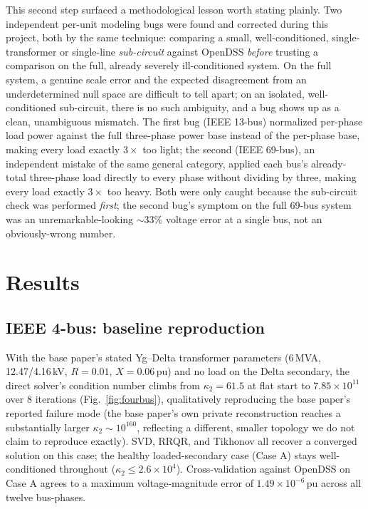 \documentclass[conference]{IEEEtran}
\begin{document}
This second step surfaced a methodological lesson worth stating plainly.
Two independent per-unit modeling bugs were found and corrected during
this project, both by the same technique: comparing a small, well-conditioned,
single-transformer or single-line \emph{sub-circuit} against OpenDSS
\emph{before} trusting a comparison on the full, already severely
ill-conditioned system. On the full system, a genuine scale error and the
expected disagreement from an underdetermined null space are difficult to
tell apart; on an isolated, well-conditioned sub-circuit, there is no such
ambiguity, and a bug shows up as a clean, unambiguous mismatch. The first
bug (IEEE 13-bus) normalized per-phase load power against the full
three-phase power base instead of the per-phase base, making every load
exactly $3\times$ too light; the second (IEEE 69-bus), an independent
mistake of the same general category, applied each bus's already-total
three-phase load directly to every phase without dividing by three,
making every load exactly $3\times$ too heavy. Both were only caught
because the sub-circuit check was performed \emph{first}; the second bug's
symptom on the full 69-bus system was an unremarkable-looking $\sim$33\%
voltage error at a single bus, not an obviously-wrong number.

\section{Results}
\label{sec:results}

\subsection{IEEE 4-bus: baseline reproduction}
With the base paper's stated Yg--Delta transformer parameters (6\,MVA,
12.47/4.16\,kV, $R=0.01$, $X=0.06$\,pu) and no load on the Delta secondary,
the direct solver's condition number climbs from $\kappa_2 = 61.5$ at flat
start to $7.85\times10^{11}$ over 8 iterations
(Fig.~\ref{fig:fourbus}), qualitatively reproducing the base paper's
reported failure mode (the base paper's own private reconstruction reaches
a substantially larger $\kappa_2 \sim 10^{160}$, reflecting a different,
smaller topology we do not claim to reproduce exactly). SVD, RRQR, and
Tikhonov all recover a converged solution on this case; the healthy
loaded-secondary case (Case A) stays well-conditioned throughout
($\kappa_2 \le 2.6\times10^4$). Cross-validation against OpenDSS on Case A
agrees to a maximum voltage-magnitude error of $1.49\times10^{-6}$\,pu
across all twelve bus-phases.
\end{document}
